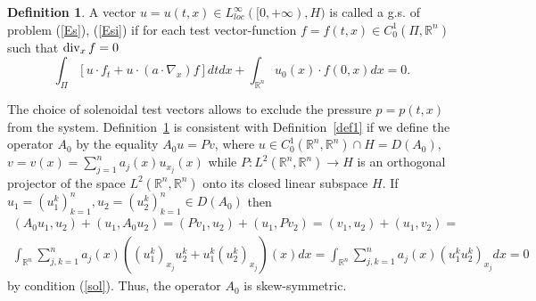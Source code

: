 \documentclass[12pt]{article}
\newcommand{\R}{{\mathbb R}}
\renewcommand{\div}{\mathop{\rm div}\nolimits}
\numberwithin{equation}{section}
\theoremstyle{plain}
\theoremstyle{definition}
\newtheorem{definition}{Definition}[section]
\begin{document}
\begin{definition}\label{def3}
A vector $u=u(t,x)\in L^\infty_{loc}([0,+\infty),H)$ is called a g.s. of problem (\ref{Es}), (\ref{Esi}) if for each test
vector-function $f=f(t,x)\in C_0^1(\Pi,\R^n)$ such that $\div_x f=0$
\[
\int_{\Pi} [u\cdot f_t+ u\cdot (a\cdot\nabla_x) f]dtdx+\int_{\R^n} u_0(x)\cdot f(0,x)dx=0.
\]
\end{definition}
The choice of solenoidal test vectors allows to exclude the pressure $p=p(t,x)$ from the system.
Definition~\ref{def3} is consistent with Definition~\ref{def1} if we define the operator $A_0$ by the equality $A_0 u=Pv$, where $u\in C_0^1(\R^n,\R^n)\cap H=D(A_0)$,
$\displaystyle v=v(x)=\sum_{j=1}^n a_j(x)u_{x_j}(x)$ while $P:L^2(\R^n,\R^n)\to H$ is an orthogonal projector of the space $L^2(\R^n,\R^n)$ onto its closed linear subspace $H$. If $u_1=(u_1^k)_{k=1}^n,u_2=(u_2^k)_{k=1}^n\in D(A_0)$ then
\begin{align*}
(A_0u_1,u_2)+(u_1,A_0u_2)=(Pv_1,u_2)+(u_1,Pv_2)=(v_1,u_2)+(u_1,v_2)=\\
\int_{\R^n}\sum_{j,k=1}^n a_j(x)((u_1^k)_{x_j}u_2^k+u_1^k(u_2^k)_{x_j})(x)dx=
\int_{\R^n}\sum_{j,k=1}^n a_j(x)(u_1^k u_2^k)_{x_j}dx=0
\end{align*}
by condition (\ref{sol}). Thus, the operator $A_0$ is skew-symmetric.
\end{document}
